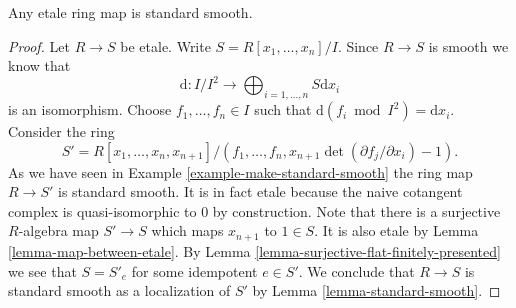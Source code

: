\begin{lemma}
\label{lemma-etale-standard-smooth}
Any etale ring map is standard smooth.
\end{lemma}

\begin{proof}
Let $R \to S$ be etale. Write $S = R[x_1, \ldots, x_n]/I$. Since $R \to S$ is
smooth we know that
$$
\text{d} :
I/I^2
\longrightarrow
\bigoplus\nolimits_{i = 1, \ldots, n} S\text{d}x_i
$$
is an isomorphism. Choose $f_1, \ldots, f_n \in I$ such that
$\text{d}(f_i \bmod I^2) = \text{d}x_i$. Consider the ring
$$
S' = R[x_1, \ldots, x_n, x_{n + 1}]/
(f_1, \ldots, f_n, x_{n + 1}\det(\partial f_j/\partial x_i) - 1).
$$
As we have seen in Example \ref{example-make-standard-smooth}
the ring map $R \to S'$ is standard smooth. It is in fact etale because
the naive cotangent complex is quasi-isomorphic to $0$ by construction. Note
that there is a surjective $R$-algebra map $S' \to S$ which maps $x_{n + 1}$
to $1 \in S$. It is also etale by Lemma \ref{lemma-map-between-etale}.
By Lemma \ref{lemma-surjective-flat-finitely-presented}
we see that $S = S'_e$ for some idempotent $e \in S'$.
We conclude that $R \to S$ is standard smooth as a localization of $S'$ by
Lemma \ref{lemma-standard-smooth}.
\end{proof}

